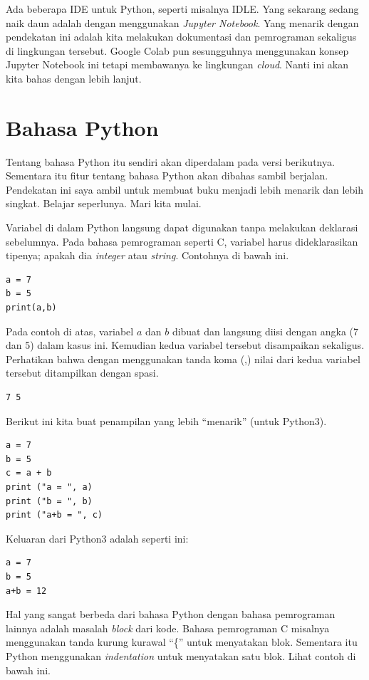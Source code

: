 Ada beberapa IDE untuk Python, seperti misalnya IDLE.
Yang sekarang sedang naik daun adalah dengan menggunakan {\em Jupyter Notebook}.
Yang menarik dengan pendekatan ini adalah kita melakukan dokumentasi dan
pemrograman sekaligus di lingkungan tersebut.
Google Colab pun sesungguhnya menggunakan konsep Jupyter Notebook ini tetapi
membawanya ke lingkungan {\em cloud}.
Nanti ini akan kita bahas dengan lebih lanjut.

\section{Bahasa Python} 
Tentang bahasa Python itu sendiri akan diperdalam pada versi berikutnya.
Sementara itu fitur tentang bahasa Python akan dibahas sambil berjalan.
Pendekatan ini saya ambil untuk membuat buku menjadi lebih menarik dan lebih
singkat. Belajar seperlunya. Mari kita mulai.

Variabel di dalam Python langsung dapat digunakan tanpa melakukan deklarasi
sebelumnya. Pada bahasa pemrograman seperti C, variabel harus dideklarasikan
tipenya; apakah dia {\em integer} atau {\em string}.
Contohnya di bawah ini.
\begin{verbatim}
a = 7
b = 5
print(a,b)
\end{verbatim}
Pada contoh di atas, variabel $a$ dan $b$ dibuat dan langsung diisi dengan
angka (7 dan 5) dalam kasus ini.
Kemudian kedua variabel tersebut disampaikan sekaligus.
Perhatikan bahwa dengan menggunakan tanda koma (,) nilai dari kedua variabel
tersebut ditampilkan dengan spasi.

\begin{verbatim}
7 5
\end{verbatim}

Berikut ini kita buat penampilan yang lebih ``menarik'' (untuk Python3).
\begin{verbatim}
a = 7
b = 5
c = a + b
print ("a = ", a)
print ("b = ", b)
print ("a+b = ", c)
\end{verbatim}

Keluaran dari Python3 adalah seperti ini:
\begin{verbatim}
a = 7
b = 5
a+b = 12
\end{verbatim}

Hal yang sangat berbeda dari bahasa Python dengan
bahasa pemrograman lainnya adalah masalah {\em block} dari kode. 
Bahasa pemrograman C misalnya menggunakan tanda kurung kurawal ``\{'' 
untuk menyatakan blok. Sementara itu Python menggunakan {\em indentation} 
untuk menyatakan satu blok. Lihat contoh di bawah ini.


